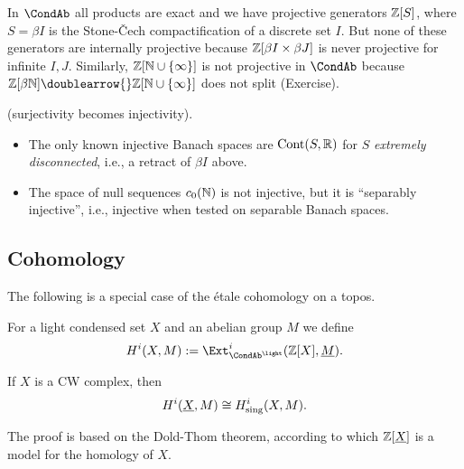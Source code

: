 \documentclass{notes}
\begin{document}
\begin{remark}
In $\CondAb$ all products are exact and we have projective generators
${\mathbb{Z}}[S]$, where $S=\beta I$ is the Stone-\v{C}ech compactification
of a discrete set $I$. But none of these generators are internally
projective because ${\mathbb{Z}}[\beta I\times\beta J]$ is never projective for
infinite $I,J$. Similarly, ${\mathbb{Z}}[{\mathbb{N}}\cup\{\infty\}]$ is not projective in
$\CondAb$ because $\Z[\beta\N]\doublearrow{}\Z[\N\cup\{\infty\}]$ does
not split (Exercise). 
\end{remark}

\begin{remark}
(surjectivity becomes injectivity).
\begin{itemize}
\item The only known injective Banach spaces are ${\rm Cont}(S,{\mathbb{R}})$ for $S$
  {\em extremely disconnected}, i.e., a retract of $\beta I$ above.  
\item The space of null sequences $c_0({\mathbb{N}})$ is not injective, but it
  is ``separably injective'', i.e., injective when tested on separable
  Banach spaces. 
\end{itemize}
\end{remark}


\subsection{Cohomology}

The following is a special case of the \'etale cohomology on a topos. 

\begin{definition}
For a light condensed set $X$ and an abelian group $M$ we define
$$
  H^i(X,M) := \Ext^i_{\CondAb^\light}(\Z[X],\ul{M}).
$$
\end{definition}

\begin{thm}
If $X$ is a CW complex, then
$$
   H^i(\underline{X},M) \cong H^i_{\rm sing}(X,M).
$$
\end{thm}

The proof is based on the Dold-Thom theorem, according to which
${\mathbb{Z}}[\underline{X}]$ is a model for the homology of $X$. 


\printbibliography
\end{document}
